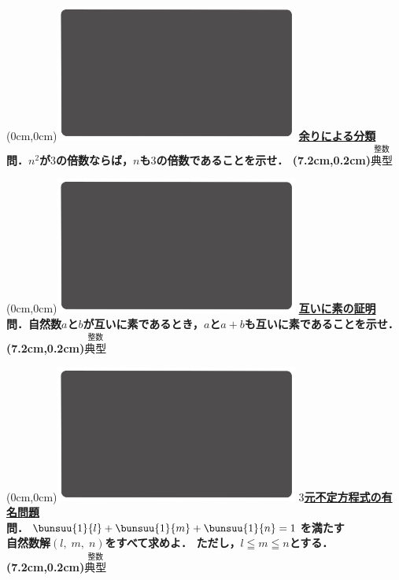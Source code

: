 \documentclass[10pt,
fleqn,
dvipdfmx,
uplatex
]{jsarticle}
\begin{document}
\newpage

\at(0cm,0cm){\includegraphics[width=8cm,bb=0 0 1920 1080]{./youtube/thumbnails/templates/smart_background/整数.jpeg}}
{\color{orange}\bf\boldmath\LARGE\underline{余りによる分類}}\vspace{0.3zw}\\
\huge 
\bf\boldmath 問．$n^2$が$3$の倍数ならば，$n$も$3$の倍数であることを示せ．
\at(7.2cm,0.2cm){\small\color{bradorange}$\overset{\text{整数}}{\text{典型}}$}

\newpage

\at(0cm,0cm){\includegraphics[width=8cm,bb=0 0 1920 1080]{./youtube/thumbnails/templates/smart_background/整数.jpeg}}
{\color{orange}\bf\boldmath\LARGE\underline{互いに素の証明}}\vspace{0.3zw}\\
\LARGE 
\bf\boldmath 問．自然数$a$と$b$が互いに素であるとき，$a$と$a+b$も互いに素であることを示せ．
\at(7.2cm,0.2cm){\small\color{bradorange}$\overset{\text{整数}}{\text{典型}}$}

\newpage

\at(0cm,0cm){\includegraphics[width=8cm,bb=0 0 1920 1080]{./youtube/thumbnails/templates/smart_background/整数.jpeg}}
{\color{orange}\bf\boldmath\Large\underline{$3$元不定方程式の有名問題}}\vspace{0.3zw}\\
\Large 
\bf\boldmath 問．$\bunsuu{1}{l}+\bunsuu{1}{m}+\bunsuu{1}{n}=1$を満たす\vspace{0.3zw}\\
自然数解$\left(l,\;m,\;n\right)$をすべて求めよ．
ただし，$l\leqq m\leqq n$とする．
\at(7.2cm,0.2cm){\small\color{bradorange}$\overset{\text{整数}}{\text{典型}}$}
\end{document}
